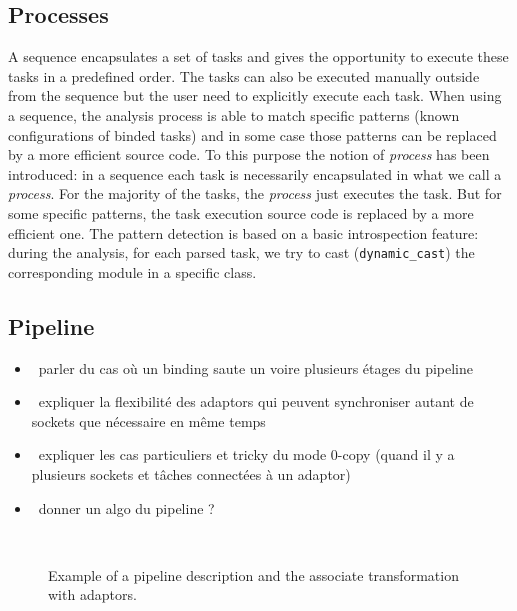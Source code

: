 \subsection{Processes}

A sequence encapsulates a set of tasks and gives the opportunity to execute
these tasks in a predefined order. The tasks can also be executed manually
outside from the sequence but the user need to explicitly execute each task.
When using a sequence, the analysis process is able to match specific patterns
(known configurations of binded tasks) and in some case those patterns can be
replaced by a more efficient source code. To this purpose the notion of
\emph{process} has been introduced: in a sequence each task is necessarily
encapsulated in what we call a \emph{process}. For the majority of the tasks,
the \emph{process} just executes the task. But for some specific patterns, the
task execution source code is replaced by a more efficient one. The pattern
detection is based on a \Cxx basic introspection feature: during the analysis,
for each parsed task, we try to cast (\verb|dynamic_cast|) the corresponding
module in a specific class.

\subsection{Pipeline}

\begin{itemize}
  \item \xmark~parler du cas où un binding saute un voire plusieurs étages du
    pipeline
  \item \xmark~expliquer la flexibilité des adaptors qui peuvent synchroniser
    autant de sockets que nécessaire en même temps
  \item \xmark~expliquer les cas particuliers et tricky du mode 0-copy (quand il
    y a plusieurs sockets et tâches connectées à un adaptor)
  \item \xmark~donner un algo du pipeline ?
\end{itemize}

\begin{figure}[htp]
  \centering
  \\
  \caption{Example of a pipeline description and the associate transformation with adaptors.}
  \label{fig:dsl_pipeline}
\end{figure}

